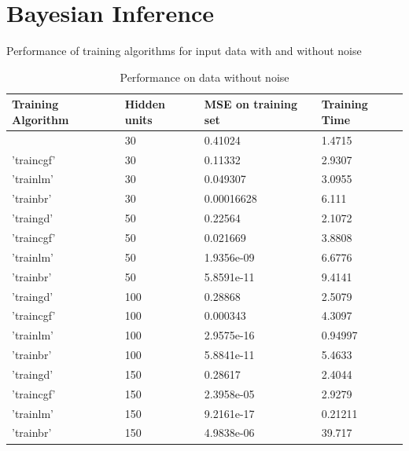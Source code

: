 \section{Bayesian Inference}
\begin{table}[!htpb]
	\captionsetup{format = hang}
	\caption{Performance of training algorithms for input data with and without noise}
	\label{table:1.2} 
\begin{subtable}{.52\linewidth}
	\centering
	\caption{Performance on data without noise \newline}\label{table:1.2.1}
	\begin{tabular}[t]{|>{\centering}p{1.8cm}|p{1.1cm}|p{2cm}|p{1.6cm}|}
	\cellcolor{blue!25}Training Algorithm & \cellcolor{blue!25}Hidden units  &  \cellcolor{blue!25} MSE on training set	 & \cellcolor{blue!25} Training Time	 \\ \hline
{'traingd' }    &   30       &    0.41024     &   1.4715  \\ \hline
{'traincgf'}    &   30       &    0.11332    &   2.9307 \\ \hline
{'trainlm' }    &   30       &    0.049307  &   3.0955\\ \hline
{'trainbr' }    &   30       &    0.00016628     &   6.111\\ \hline
{'traingd' }    &   50       &    0.22564     &   2.1072\\ \hline
{'traincgf'}    &   50       &    0.021669    &   3.8808\\ \hline
{'trainlm' }    &   50       &    1.9356e-09  &   6.6776\\ \hline
{'trainbr' }    &   50       &    5.8591e-11  &   9.4141\\ \hline
{'traingd' }    &   100      &    0.28868     &   2.5079\\ \hline
{'traincgf'}    &   100      &    0.000343 &   4.3097\\ \hline
{'trainlm' }    &   100      &    2.9575e-16  &   0.94997\\ \hline
{'trainbr' }    &   100      &    5.8841e-11  &   5.4633\\ \hline
{'traingd' }    &   150      &    0.28617     &   2.4044\\ \hline
{'traincgf'}    &   150      &    2.3958e-05  &   2.9279\\ \hline
{'trainlm' }    &   150      &    9.2161e-17  &   0.21211\\ \hline
{'trainbr' }    &   150      &    4.9838e-06  &   39.717\\ \hline
	\end{tabular}

\end{subtable}
\end{table}
